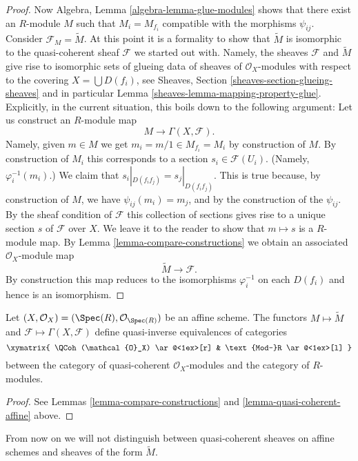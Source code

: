\begin{proof}
\medskip\noindent
Now Algebra, Lemma \ref{algebra-lemma-glue-modules}
shows that there exist an $R$-module $M$ such that
$M_i = M_{f_i}$ compatible with the morphisms $\psi_{ij}$.
Consider $\mathcal{F}_M = \widetilde M$. At this point it is
a formality to show that $\widetilde M$ is isomorphic to
the quasi-coherent sheaf $\mathcal{F}$ we started out with.
Namely, the sheaves $\mathcal{F}$ and $\widetilde M$ give
rise to isomorphic sets of glueing data of sheaves of $\mathcal{O}_X$-modules
with respect to the covering $X = \bigcup D(f_i)$, see
Sheaves, Section \ref{sheaves-section-glueing-sheaves}
and in particular Lemma \ref{sheaves-lemma-mapping-property-glue}.
Explicitly, in the current situation, this boils down to
the following argument: Let us construct an $R$-module map
$$
M \longrightarrow \Gamma(X, \mathcal{F}).
$$
Namely, given $m \in M$ we get $m_i = m/1 \in M_{f_i} = M_i$
by construction of $M$. By construction of $M_i$ this corresponds
to a section $s_i \in \mathcal{F}(U_i)$. (Namely, $\varphi^{-1}_i(m_i)$.)
We claim that $s_i|_{D(f_if_j)} = s_j|_{D(f_if_j)}$. This is
true because, by construction of $M$, we have $\psi_{ij}(m_i) = m_j$,
and by the construction of the $\psi_{ij}$. By the sheaf condition of
$\mathcal{F}$ this collection of sections gives rise to a unique
section $s$ of $\mathcal{F}$ over $X$. We leave it to the reader
to show that $m \mapsto s$ is a $R$-module map.
By Lemma \ref{lemma-compare-constructions} we obtain an associated
$\mathcal{O}_X$-module map
$$
\widetilde M \longrightarrow \mathcal{F}.
$$
By construction this map reduces to the isomorphisms
$\varphi_i^{-1}$ on each $D(f_i)$ and hence is an isomorphism.
\end{proof}

\begin{lemma}
\label{lemma-equivalence-quasi-coherent}
Let $(X, \mathcal{O}_X) = (\Spec(R), \mathcal{O}_{\Spec(R)})$
be an affine scheme.
The functors $M \mapsto \widetilde M$ and
$\mathcal{F} \mapsto \Gamma(X, \mathcal{F})$ define quasi-inverse
equivalences of categories
$$
\xymatrix{
\QCoh(\mathcal{O}_X)
\ar@<1ex>[r]
&
\text{Mod-}R
\ar@<1ex>[l]
}
$$
between the category of quasi-coherent $\mathcal{O}_X$-modules
and the category of $R$-modules.
\end{lemma}

\begin{proof}
See Lemmas \ref{lemma-compare-constructions}
and \ref{lemma-quasi-coherent-affine} above.
\end{proof}

\noindent
From now on we will not distinguish between quasi-coherent
sheaves on affine schemes and sheaves of the form $\widetilde M$.

